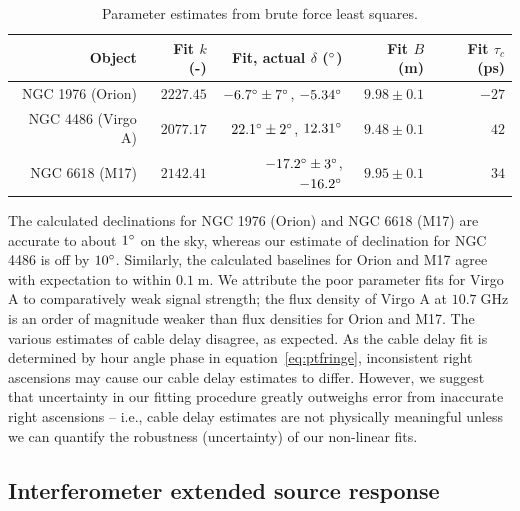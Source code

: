 \documentclass[10pt]{article}
\newcommand {\mt}{\mathrm}
\newcommand {\unit}[1]{\; \mt{#1}}
\begin{document}
\begin{table}[!ht]
\centering
\caption{Parameter estimates from brute force least squares.}
\label{tab:dec}
\begin{tabular}{@{}rrrrr@{}}
    \toprule
    Object & Fit $k$ (-)
        & Fit, actual $\delta$ ($\degree$)
        & Fit $B$ (m) & Fit $\tau_c$ (ps) \\
    \midrule
    NGC 1976 (Orion) & $2227.45$
        & $-6.7\degree \pm 7\degree$, $-5.34\degree$
        & $9.98 \pm 0.1$ & $-27$ \\
    NGC 4486 (Virgo A) & $2077.17$
        & $22.1\degree \pm 2\degree$, $12.31\degree$
        & $9.48 \pm 0.1$ & $42$ \\
    NGC 6618 (M17) & $2142.41$
        & $-17.2\degree \pm 3\degree$, $-16.2\degree$
        & $9.95 \pm 0.1$ & $34$ \\
    \bottomrule
\end{tabular}
\end{table}

The calculated declinations for NGC 1976 (Orion) and NGC 6618 (M17) are accurate to about $1\degree$ on the sky, whereas our estimate of declination for NGC 4486 is off by $10\degree$.  Similarly, the calculated baselines for Orion and M17 agree with expectation to within $0.1 \unit{m}$.  We attribute the poor parameter fits for Virgo A to comparatively weak signal strength; the flux density of Virgo A at $10.7 \unit{GHz}$ is an order of magnitude weaker than flux densities for Orion and M17.  The various estimates of cable delay disagree, as expected.  As the cable delay fit is determined by hour angle phase in equation~\ref{eq:ptfringe}, inconsistent right ascensions may cause our cable delay estimates to differ.  However, we suggest that uncertainty in our fitting procedure greatly outweighs error from inaccurate right ascensions -- i.e., cable delay estimates are not physically meaningful unless we can quantify the robustness (uncertainty) of our non-linear fits.

\subsection{Interferometer extended source response}
\end{document}
